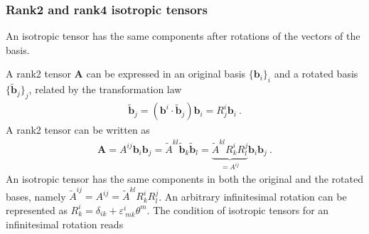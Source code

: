 \documentclass[letterpaper,10pt,english]{jupyterBook}
\begin{document}
\subsubsection*{Rank\sphinxhyphen{}2 and rank\sphinxhyphen{}4 isotropic tensors}

\sphinxAtStartPar
An isotropic tensor has the same components after rotations of the vectors of the basis.

\sphinxAtStartPar
{} A rank\sphinxhyphen{}2 tensor \(\mathbf{A}\) can be expressed in an original basis \(\{ \mathbf{b}_i \}_i\) and a rotated basis \(\{ \widetilde{\mathbf{b}}_j \}_j\), related by the transformation law
\begin{equation*}
\begin{split}\widetilde{\mathbf{b}}_j = \left( \mathbf{b}^i \cdot \widetilde{\mathbf{b}}_j \right) \mathbf{b}_i = R^{i}_{j} \mathbf{b}_i \ .\end{split}
\end{equation*}
\sphinxAtStartPar
A rank\sphinxhyphen{}2 tensor can be written as
\begin{equation*}
\begin{split}\mathbf{A} = A^{ij} \mathbf{b}_i \mathbf{b}_j = \widetilde{A}^{kl} \widetilde{\mathbf{b}}_k \widetilde{\mathbf{b}}_l = \underbrace{\widetilde{A}^{kl} R^i_k R^j_l}_{=A^{ij}} \mathbf{b}_i \mathbf{b}_j \ .\end{split}
\end{equation*}
\sphinxAtStartPar
An isotropic tensor has the same components in both the original and the rotated bases, namely \(\widetilde{A}^{ij} = A^{ij} = \widetilde{A}^{kl} R^i_k R^j_l\). An arbitrary infinitesimal rotation can be represented as \(R^i_k = \delta_{ik} + \varepsilon^i_{\ mk} \theta^m\). The condition of isotropic tensors for an infinitesimal rotation reads
\end{document}
